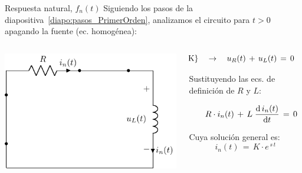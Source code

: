 \documentclass[aspectratio=169, usenames,svgnames,dvipsnames]{beamer}
\begin{document}

\begin{frame}{Respuesta natural, \hspace{3mm}$f_n(t)$}
    Siguiendo los pasos de la diapositiva~\ref{diapo:pasos_PrimerOrden}, analizamos el circuito para $t>0$ \alert{apagando la fuente} (ec. homogénea):
    \begin{columns}
    \begin{column}{0.5\columnwidth}
        \begin{center}
            \includegraphics[height=0.55\textheight]{../figs/transitorio_circuitoRL_t0+_Natural.pdf}
        \end{center}
    \end{column}
    \begin{column}{0.5\columnwidth}
        \vspace{5mm}
        \[
          \hspace*{-20mm} \textrm{\alert{2LK}} \quad\rightarrow\quad u_R(t) \,+\, u_L(t) \, = \, 0
        \]
        
        \vspace{2mm}
        Sustituyendo las \alert{ecs. de definición} de $R$ y $L$:
        
        \[
          \hspace*{5mm} R \cdot i_n(t) \,+\, L \; \diff{\,i_n(t)}{t} \, = \,  0
        \]

        \vspace{2mm}
        Cuya \alert{solución general} es:
        \[
          \boxed{\; i_n(t) \,=\, K \cdot e^{\,s\,t} \;}
        \]
    \end{column}
    \end{columns}    
\end{frame}
\end{document}
